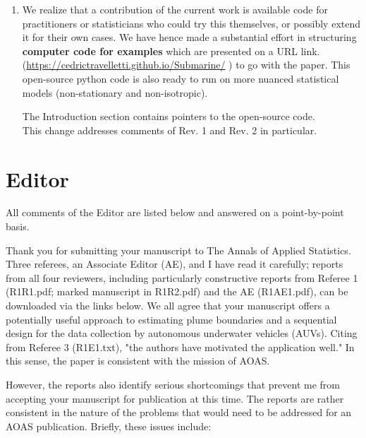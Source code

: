 \documentclass[a4paper]{article}
\newcounter{reviewer}
\begin{document}
\begin{enumerate}
\item We realize that a contribution of the current work is available code for practitioners or statisticians who could try this themselves, or possibly extend it for their own cases. We have hence made a substantial effort in structuring {\bf{computer code for examples}} which are presented on a URL link. (\url{https://cedrictravelletti.github.io/Submarine/} )
 to go with the paper. This open-source python code is also ready to run on more nuanced statistical models (non-stationary and non-isotropic). 
 
The Introduction section contains pointers to the open-source code. \\
This change addresses comments of Rev. 1 and Rev. 2 in particular.

\end{enumerate}
\par \vspace{1em}


\section*{Editor}
All comments of the Editor are listed below and answered on a point-by-point basis.

	
\vspace{5mm}

Thank you for submitting your manuscript to The Annals of 
Applied Statistics.  Three referees, an Associate Editor (AE),
and I have read it carefully; reports from all four reviewers,
including particularly constructive reports from Referee 1
(R1R1.pdf; marked manuscript in R1R2.pdf) and the AE (R1AE1.pdf), 
can be downloaded via the links below. We all agree that your 
manuscript offers a potentially useful approach to estimating 
plume boundaries and a sequential design for the data collection
by autonomous underwater vehicles (AUVs). Citing from Referee 3
(R1E1.txt), "the authors have motivated the application well."
In this sense, the paper is consistent with the mission of AOAS.

However, the reports also identify serious shortcomings that 
prevent me from accepting your manuscript for publication at
this time. The reports are rather consistent in the nature of 
the problems that would need to be addressed for an AOAS publication.  
Briefly, these issues include:
\end{document}
